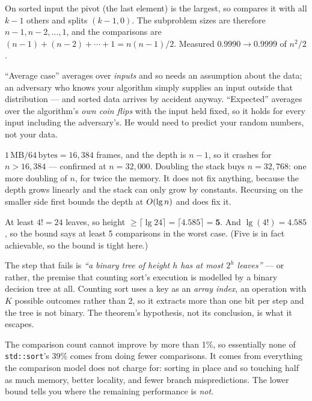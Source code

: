 \begin{ans}
  \item On sorted input the pivot (the last element) is the largest, so
         compares it with all $k-1$ others and splits
        $(k-1, 0)$. The subproblem sizes are therefore $n-1, n-2, \ldots, 1$,
        and the comparisons are $(n-1) + (n-2) + \cdots + 1 = n(n-1)/2$.
        Measured $0.9990 \to 0.9999$ of $n^{2}/2$.
  \item ``Average case'' averages over \emph{inputs} and so needs an assumption
        about the data; an adversary who knows your algorithm simply supplies
        an input outside that distribution --- and sorted data arrives by
        accident anyway. ``Expected'' averages over the algorithm's \emph{own
        coin flips} with the input held fixed, so it holds for every input
        including the adversary's. He would need to predict your random numbers,
        not your data.
  \item $1\,\text{MB} / 64\,\text{bytes} = 16{,}384$ frames, and the depth is
        $n-1$, so it crashes for $n > 16{,}384$ --- confirmed at
        $n = 32{,}000$. Doubling the stack buys $n = 32{,}768$: one more
        doubling of $n$, for twice the memory. It does not fix anything,
        because the depth grows linearly and the stack can only grow by
        constants. Recursing on the smaller side first bounds the depth at
        $O(\operatorname{lg} n)$ and does fix it.
\end{ans}

\begin{ans}
  \item At least $4! = 24$ leaves, so height $\ge \lceil \lg 24 \rceil =
        \lceil 4.585 \rceil = \mathbf{5}$. And $\lg(4!) = 4.585$, so the bound
        says at least 5 comparisons in the worst case. (Five is in fact
        achievable, so the bound is tight here.)
  \item The step that fails is \emph{``a binary tree of height $h$ has at most
        $2^{h}$ leaves''} --- or rather, the premise that counting sort's
        execution is modelled by a binary decision tree at all. Counting sort
        uses a key as an \emph{array index}, an operation with $K$ possible
        outcomes rather than 2, so it extracts more than one bit per step and
        the tree is not binary. The theorem's hypothesis, not its conclusion,
        is what it escapes.
  \item The comparison count cannot improve by more than 1\%, so essentially
        none of \texttt{std::sort}'s 39\% comes from doing fewer comparisons.
        It comes from everything the comparison model does not charge for:
        sorting in place and so touching half as much memory, better locality,
        and fewer branch mispredictions. The lower bound tells you where the
        remaining performance is \emph{not}.
\end{ans}

